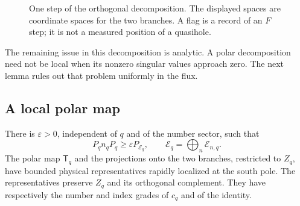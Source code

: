 \begin{figure}[tb]
\centering
{}
\caption{One step of the orthogonal decomposition.  The displayed spaces
are coordinate spaces for the two branches.  A flag is a record of an
$F$ step; it is not a measured position of a quasihole.}
\label{fig:flags-branches}
\end{figure}

The remaining issue in this decomposition is analytic.  A polar
decomposition need not be local when its nonzero singular values approach
zero.  The next lemma rules out that problem uniformly in the flux.

\subsection{A local polar map}

\begin{lemma}
\label{lem:flags-polar}
There is $\varepsilon>0$, independent of $q$ and of the number sector,
such that
\begin{equation}
 P_q n_qP_q\geq\varepsilon P_{\mathcal E_q},
 \qquad \mathcal E_q=\bigoplus_n\mathcal E_{n,q}.
 \label{eq:flags-occupation-gap}
\end{equation}
The polar map $\mathsf T_q$ and the projections onto the two branches, restricted
to $Z_q$, have bounded physical representatives rapidly localized at the
south pole.  The representatives preserve $Z_q$ and its orthogonal
complement.  They have respectively the number and index grades of $c_q$
and of the identity.
\end{lemma}

